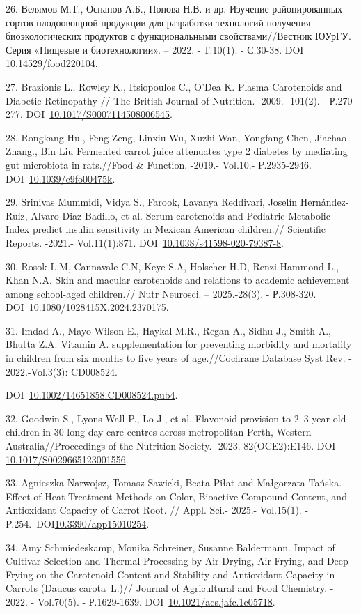 \begin{refs}
26. Велямов М.Т., Оспанов А.Б., Попова Н.В. и др. Изучение
районированных сортов плодоовощной продукции для разработки технологий
получения биоэкологических продуктов с функциональными
свойствами//Вестник ЮУрГУ. Серия «Пищевые и биотехнологии». -- 2022. -
Т.10(1). - С.30-38. DOI 10.14529/food220104.

27. Brazionis L., Rowley K., Itsiopoulos C., O'Dea K. Plasma Carotenoids
and Diabetic Retinopathy // The British Journal of Nutrition.- 2009.
-101(2). - Р.270-277.
DOI~\href{https://doi.org/10.1017/s0007114508006545}{10.1017/S0007114508006545}.

28. Rongkang Hu., Feng Zeng, Linxiu Wu, Xuzhi Wan, Yongfang Chen,
Jiachao Zhang., Bin Liu Fermen\-ted carrot juice attenuates type 2
diabetes by mediating gut microbiota in rats.//Food \& Function. -2019.-
Vol.10.- P.2935-2946.
DOI~\href{https://doi.org/10.1039/c9fo00475k}{10.1039/c9fo00475k}.

29. Srinivas Mummidi, Vidya S., Farook, Lavanya Reddivari, Joselín
Hernández-Ruiz, Alvaro Diaz-Badillo, et al. Serum carotenoids and
Pediatric Metabolic Index predict insulin sensitivity in Mexican
American children.// Scientific Reports. -2021.- Vol.11(1):871.
DOI~\href{https://doi.org/10.1038/s41598-020-79387-8}{10.1038/s41598-020-79387-8}.

30. Rosok L.M, Cannavale C.N, Keye S.A, Holscher H.D, Renzi-Hammond L.,
Khan N.A. Skin and macular carotenoids and relations to academic
achievement among school-aged children.// Nutr Neurosci. -- 2025.-28(3).
- Р.308-320.
DOI~\href{https://doi.org/10.1080/1028415x.2024.2370175}{10.1080/1028415X.2024.2370175}.

31. Imdad A., Mayo-Wilson E., Haykal M.R., Regan A., Sidhu J., Smith A.,
Bhutta Z.A. Vitamin A. supplementation for preventing morbidity and
mortality in children from six months to five years of age.//Cochrane
Database Syst Rev. - 2022.-Vol.3(3): CD008524.

DOI~\href{https://doi.org/10.1002/14651858.cd008524.pub4}{10.1002/14651858.CD008524.pub4}.

32. Goodwin S., Lyons-Wall P., Lo J., et al. Flavonoid provision to
2--3-year-old children in 30 long day care centres across metropolitan
Perth, Western Australia//Proceedings of the Nutrition Society. -2023.
82(OCE2):E146. DOI
\href{http://dx.doi.org/10.1017/S0029665123001556}{10.1017/S0029665123001556}.

33. Agnieszka Narwojsz, Tomasz Sawicki, Beata Piłat and Małgorzata
Tańska. Effect of Heat Treatment Methods on Color, Bioactive Compound
Content, and Antioxidant Capacity of Carrot Root. // Appl. Sci.- 2025.-
Vol.15(1). -
P.254.~DOI\href{http://dx.doi.org/10.3390/app15010254}{10.3390/app15010254}.

34. Amy Schmiedeskamp, Monika Schreiner, Susanne Baldermann. Impact of
Cultivar Selection and Thermal Processing by Air Drying, Air Frying, and
Deep Frying on the Carotenoid Content and Stability and Antioxidant
Capacity in Carrots (Daucus carota~L.)// Journal of Agricultural and
Food Chemistry. - 2022. - Vol.70(5). - Р.1629-1639.
DOI~\href{https://doi.org/10.1021/acs.jafc.1c05718}{10.1021/acs.jafc.1c05718}.
\end{refs}

